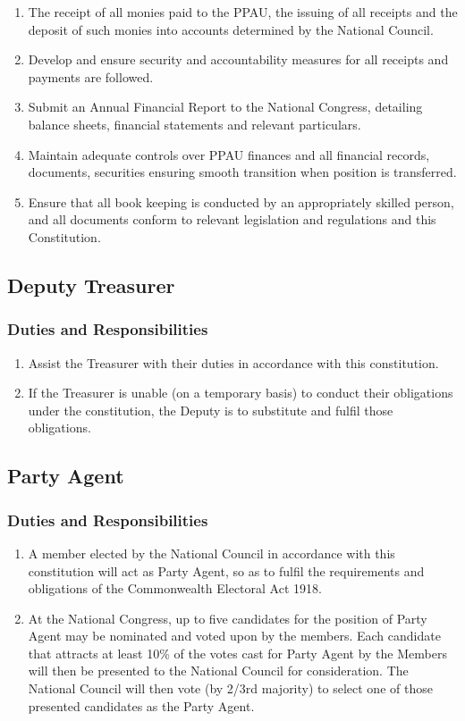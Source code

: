 \documentclass[a4paper,titlepage,8.5pt]{article}
\begin{document}
\begin{enumerate}
\item The receipt of all monies paid to the PPAU, the issuing of all receipts and the deposit of such monies into accounts determined by the National Council.
\item Develop and ensure security and accountability measures for all receipts and payments are followed.
\item Submit an Annual Financial Report to the National Congress, detailing balance sheets, financial statements and relevant particulars.
\item Maintain adequate controls over PPAU finances and all financial records, documents, securities ensuring smooth transition when position is transferred.
\item Ensure that all book keeping is conducted by an appropriately skilled person, and all documents conform to relevant legislation and regulations and this Constitution.
\end{enumerate}

\subsection{Deputy Treasurer}

\subsubsection{Duties and Responsibilities}

\begin{enumerate}
\item Assist the Treasurer with their duties in accordance with this constitution.
\item If the Treasurer is unable (on a temporary basis) to conduct their obligations under the constitution, the Deputy is to substitute and fulfil those obligations.
\end{enumerate}

\subsection{Party Agent}

\subsubsection{Duties and Responsibilities}
\begin{enumerate}
\item A member elected by the National Council in accordance with this constitution will act as Party Agent, so as to fulfil the requirements and obligations of the Commonwealth Electoral Act 1918.
\item At the National Congress, up to five candidates for the position of Party Agent may be nominated and voted upon by the members. Each candidate that attracts at least 10\% of the votes cast for Party Agent by the Members will then be presented to the National Council for consideration. The National Council will then vote (by 2/3rd majority) to select one of those presented candidates as the Party Agent.
\end{enumerate}
\end{document}
